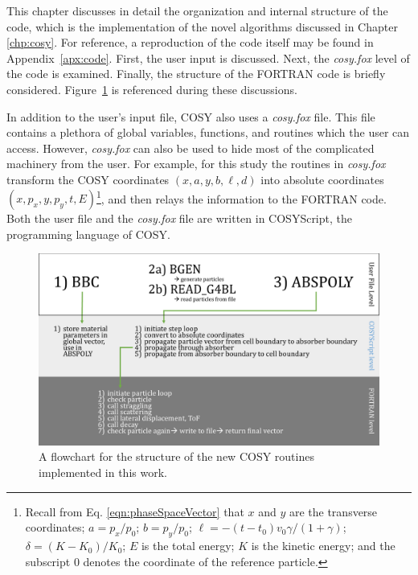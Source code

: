 This chapter discusses in detail the organization and internal structure of the code, which is the implementation of the novel algorithms discussed in Chapter \ref{chp:cosy}. For reference, a reproduction of the code itself may be found in Appendix~\ref{apx:code}. First, the user input is discussed. Next, the \textit{cosy.fox} level of the code is examined. Finally, the structure of the FORTRAN code is briefly considered. Figure~\ref{fig:cosy_flowchart} is referenced during these discussions.

In addition to the user's input file, COSY also uses a \textit{cosy.fox} file. This file contains a plethora of global variables, functions, and routines which the user can access. However, \textit{cosy.fox} can also be used to hide most of the complicated machinery from the user. For example, for this study the routines in \textit{cosy.fox} transform the COSY coordinates $(x, a, y, b, \ell, d)$ into absolute coordinates $(x, p_x, y, p_y, t, E)$\footnote{Recall from Eq. \eqref{eqn:phaseSpaceVector} that $x$ and $y$ are the transverse coordinates; $a=p_x/p_0$; $b=p_y/p_0$; $\ell=-(t-t_0)v_0\gamma/(1+\gamma)$; $\delta=(K-K_0)/K_0$; $E$ is the total energy; $K$ is the kinetic energy; and the subscript $0$ denotes the coordinate of the reference particle.}, and then relays the information to the FORTRAN code. Both the user file and the \textit{cosy.fox} file are written in COSYScript, the programming language of COSY. 

\begin{figure}[!htb]
  \centering
    \includegraphics[width=\textwidth]{Figures/cosy_flowchart} 
  \caption{A flowchart for the structure of the new COSY routines implemented in this work.}
  \label{fig:cosy_flowchart}
\end{figure}

\label{ssc:user_input}

